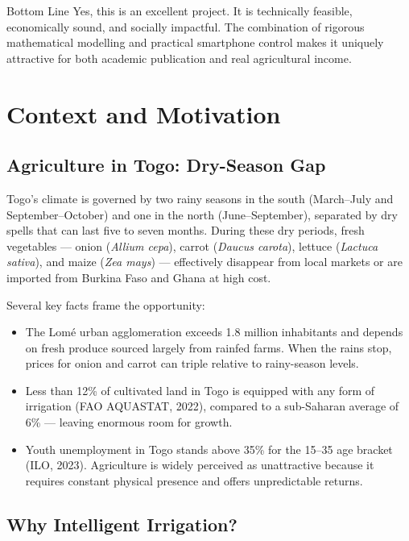 \documentclass[12pt, a4paper]{report}
\begin{document}
\begin{keybox}{Bottom Line}
Yes, this is an excellent project. It is technically feasible, economically sound, and socially impactful. The combination of rigorous mathematical modelling and practical smartphone control makes it uniquely attractive for both academic publication and real agricultural income.
\end{keybox}

\newpage

\chapter{Context and Motivation}

\section{Agriculture in Togo: Dry-Season Gap}

Togo's climate is governed by two rainy seasons in the south (March–July and September–October) and one in the north (June–September), separated by dry spells that can last five to seven months. During these dry periods, fresh vegetables — onion (\textit{Allium cepa}), carrot (\textit{Daucus carota}), lettuce (\textit{Lactuca sativa}), and maize (\textit{Zea mays}) — effectively disappear from local markets or are imported from Burkina Faso and Ghana at high cost.

Several key facts frame the opportunity:
\begin{itemize}[leftmargin=2em]
  \item The Lomé urban agglomeration exceeds 1.8 million inhabitants and depends on fresh produce sourced largely from rainfed farms. When the rains stop, prices for onion and carrot can triple relative to rainy-season levels.
  \item Less than 12\% of cultivated land in Togo is equipped with any form of irrigation (FAO AQUASTAT, 2022), compared to a sub-Saharan average of 6\% — leaving enormous room for growth.
  \item Youth unemployment in Togo stands above 35\% for the 15–35 age bracket (ILO, 2023). Agriculture is widely perceived as unattractive because it requires constant physical presence and offers unpredictable returns.
\end{itemize}

\section{Why Intelligent Irrigation?}
\end{document}
